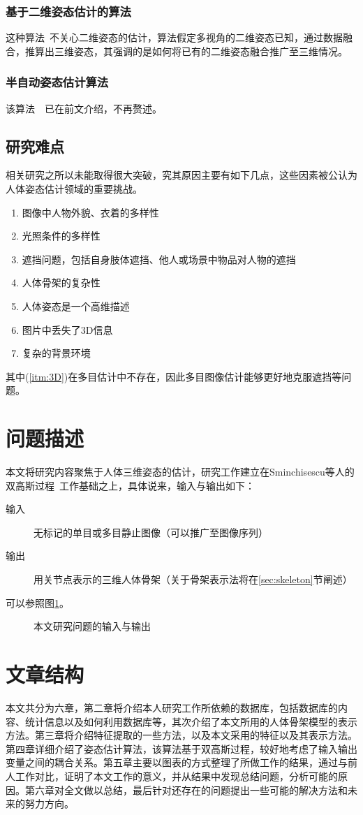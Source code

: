 \subsubsection{基于二维姿态估计的算法}
这种算法~\cite{burenius20133d}不关心二维姿态的估计，算法假定多视角的二维姿态已知，通过数据融合，推算出三维姿态，其强调的是如何将已有的二维姿态融合推广至三维情况。

\subsubsection{半自动姿态估计算法}
该算法~\cite{wei2009modeling}~\cite{wei2010videomocap}已在前文介绍，不再赘述。

\subsection{研究难点}
相关研究之所以未能取得很大突破，究其原因主要有如下几点，这些因素被公认为人体姿态估计领域的重要挑战。
\begin{enumerate}[(1)]
  \item 图像中人物外貌、衣着的多样性
  \item 光照条件的多样性
  \item 遮挡问题，包括自身肢体遮挡、他人或场景中物品对人物的遮挡
  \item 人体骨架的复杂性
  \item 人体姿态是一个高维描述
  \item \label{itm:3D}图片中丢失了3D信息
  \item 复杂的背景环境
\end{enumerate}
其中(\ref{itm:3D})在多目估计中不存在，因此多目图像估计能够更好地克服遮挡等问题。

\section{问题描述}
本文将研究内容聚焦于人体三维姿态的估计，研究工作建立在Sminchisescu等人的双高斯过程~\cite{bo2010twin}工作基础之上，具体说来，输入与输出如下：
\begin{description}
  \item[输入] 无标记的单目或多目静止图像（可以推广至图像序列）
  \item[输出] 用关节点表示的三维人体骨架（关于骨架表示法将在\ref{sec:skeleton}节阐述）
\end{description}

可以参照图\ref{fig:inout}。

\begin{figure}[htbp]
    \centering
    \hspace{2cm}
    \caption{本文研究问题的输入与输出}
    \label{fig:inout}
\end{figure}


\section{文章结构}
本文共分为六章，第二章将介绍本人研究工作所依赖的数据库，包括数据库的内容、统计信息以及如何利用数据库等，其次介绍了本文所用的人体骨架模型的表示方法。第三章将介绍特征提取的一些方法，以及本文采用的特征以及其表示方法。第四章详细介绍了姿态估计算法，该算法基于双高斯过程，较好地考虑了输入输出变量之间的耦合关系。第五章主要以图表的方式整理了所做工作的结果，通过与前人工作对比，证明了本文工作的意义，并从结果中发现总结问题，分析可能的原因。第六章对全文做以总结，最后针对还存在的问题提出一些可能的解决方法和未来的努力方向。
